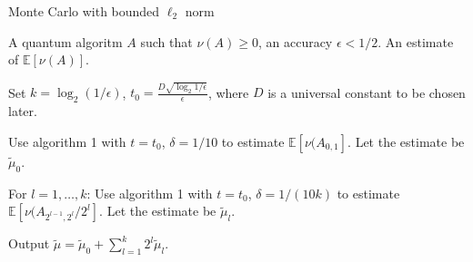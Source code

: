 \documentclass{article}
\begin{document}
\pagestyle{empty}

\begin{algorithm}[ht]
	\caption{Monte Carlo with bounded $\ell_2$ norm}
	\begin{algorithmic}[1]

		\Require  A quantum algoritm $A$ such that $\nu(A) \geq 0$, an accuracy $\epsilon< 1/2$.
		\Ensure An estimate of $\mathbb{E}[\nu(A)]$.
		\vspace{10pt}
		\Statex

		\State Set $k = \log_2(1/\epsilon)$, $t_0 =\frac{D\sqrt{\log_2{1/\epsilon}}}{\epsilon}$, where $D$ is a universal constant to be chosen later.

		\State Use algorithm 1 with $t=t_0$, $\delta = 1/10$ to estimate $\mathbb{E}[\nu(A_{0,1}]$. Let the estimate be $\widetilde{\mu}_0$.

		\State For $l = 1,\dots, k$:
		 Use algorithm 1 with $t=t_0$, $\delta = 1/(10k)$ to estimate $\mathbb{E}[\nu(A_{2^{l-1},2^l}/2^l]$. Let the estimate be $\widetilde{\mu}_l$.

		\State Output $\widetilde{\mu} = \widetilde{\mu}_0 + \sum_{l=1}^k 2^l \widetilde{\mu}_l$.


	\end{algorithmic}
\end{algorithm}
\end{document}
